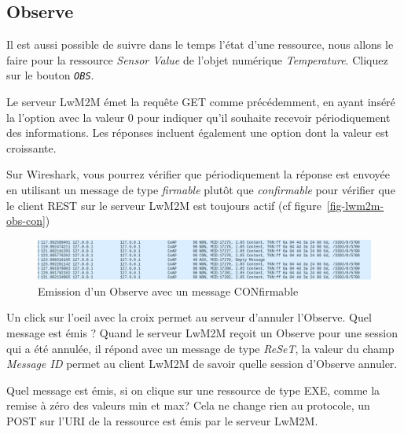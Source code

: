 \subsection{Observe}

Il est aussi possible de suivre dans le temps l'état d'une ressource, nous allons le faire pour la ressource \textit{Sensor Value} de l'objet numérique \textit{Temperature}. Cliquez sur le bouton \texttt{\textit{OBS}}.

Le serveur LwM2M émet la requête GET comme précédemment, en ayant inséré la l'option \textit{} avec la valeur 0 pour indiquer qu'il souhaite recevoir périodiquement des informations. Les réponses incluent également une option \textit{}  dont la valeur est croissante.

Sur Wireshark, vous pourrez vérifier que périodiquement la réponse est envoyée en utilisant un message de type \textit{firmable} plutôt que \textit{ confirmable} pour vérifier que le client REST sur le serveur LwM2M est toujours actif (cf figure~\vref{fig-lwm2m-obs-con})

\begin{figure}[tbp]
\centerline{\includegraphics[width=1\columnwidth]{Pictures/lwm2m-observe-con.png}}
\caption{Emission d'un Observe avec un message CONfirmable}
\label{fig-lwm2m-obs-con}
\end{figure}

{Un click sur l'oeil avec la croix permet au serveur d'annuler l'Observe. Quel message est émis ?}
{Quand le serveur LwM2M reçoit un Observe pour une session qui a été annulée, il répond avec un message de type \textit{ReSeT}, la valeur du champ \textit{Message ID} permet au client LwM2M de savoir quelle session d'Observe annuler.
}

{Quel message est émis, si on clique sur une ressource de type EXE, comme la remise à zéro des valeurs min et max?}
{Cela ne change rien au protocole, un POST sur l'URI de la ressource est émis par le serveur LwM2M.}